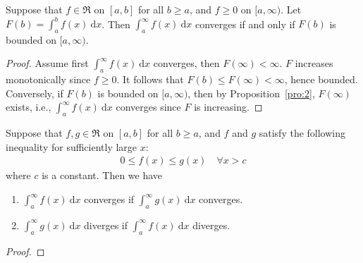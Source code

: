 \documentclass[thmcnt=section, 12pt]{elegantbook}
\begin{document}

\begin{theorem}
    Suppose that $f \in \mathfrak{R}$ on $[a,b]$ for all $b \geq a$, and $f \geq 0$ on $[a, \infty)$. Let $F(b) = \int_a^b f(x) \ \mathrm{d}x$. Then $\int_a^\infty f(x) \ \mathrm{d}x$ converges if and only if $F(b)$ is bounded on $[a, \infty)$.
\end{theorem}

\begin{proof}
    Assume first $\int_a^\infty f(x) \ \mathrm{d}x$ converges, then $F(\infty) < \infty$. $F$ increases monotonically since $f \geq 0$. It follows that $F(b) \leq F(\infty) < \infty$, hence bounded. Conversely, if $F(b)$ is bounded on $[a, \infty)$, then by Proposition~\ref{pro:2}, $F(\infty)$ exists, i.e., $\int_a^\infty f(x) \ \mathrm{d}x$ converges since $F$ is increasing.
\end{proof}


\begin{theorem} \label{thm:25}
    Suppose that $f, g \in \mathfrak{R}$ on $[a, b]$ for all $b \geq a$, and $f$ and $g$ satisfy the following inequality for sufficiently large $x$:
    \begin{align*}
        0 \leq f(x) \leq g(x)
        \quad \forall x > c
    \end{align*}
    where $c$ is a constant. Then we have 
    \begin{enumerate}
        \item $\int_a^\infty f(x) \ \mathrm{d}x$ converges if $\int_a^\infty g(x) \ \mathrm{d}x$ converges.
        \item $\int_a^\infty g(x) \ \mathrm{d}x$ diverges if $\int_a^\infty f(x) \ \mathrm{d}x$ diverges.
    \end{enumerate}
\end{theorem}

\begin{proof}
\end{proof}

\end{document}
